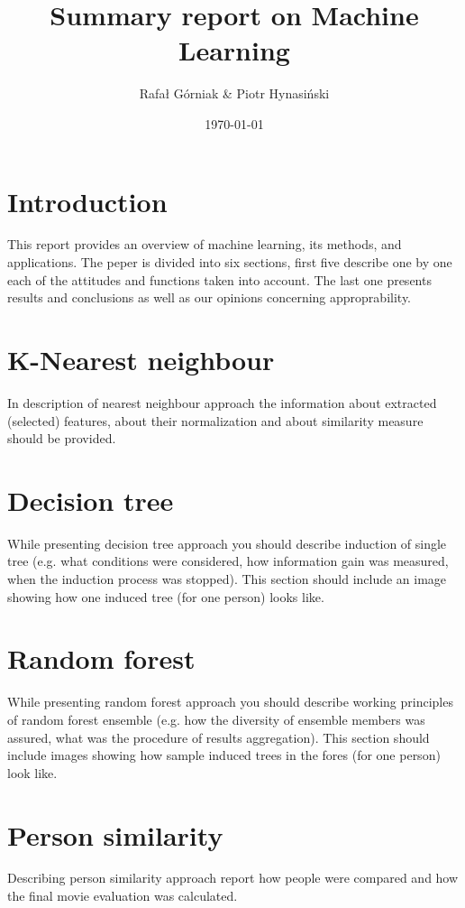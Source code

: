 \documentclass{article}
\title{Summary report on Machine Learning}
\author{Rafał Górniak \& Piotr Hynasiński}
\date{\today}
\begin{document}
\maketitle

\vspace{1cm}

\section{Introduction}

This report provides an overview of machine learning, its methods, and applications. The peper is divided into six sections, first five
describe one by one each of the attitudes and functions taken into account. The last one presents results and conclusions as well as
our opinions concerning approprability.

\newpage
\section{K-Nearest neighbour}
In description of nearest neighbour approach the information about extracted (selected) features, about their normalization and about similarity measure should be provided.


\newpage
\section{Decision tree}
While presenting decision tree approach you should describe induction of single tree (e.g. what conditions were considered, how information gain was measured, when the induction process was stopped). This section should include an image showing how one induced tree (for one person) looks like.


\newpage
\section{Random forest}
While presenting random forest approach you should describe working principles of random forest ensemble (e.g. how the diversity of ensemble members was assured, what was the procedure of results aggregation). This section should include images showing how sample induced trees in the fores (for one person) look like.


\newpage
\section{Person similarity}
Describing person similarity approach report how people were compared and how the final movie evaluation was calculated.
\end{document}

